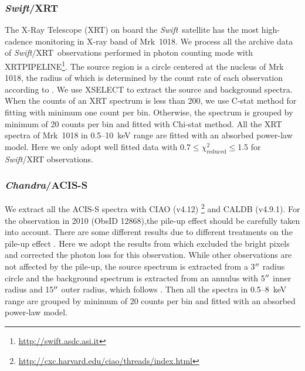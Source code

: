 \documentclass[twocolumn]{aastex63}
\newcommand{\chandra}{{\em Chandra}}
\newcommand{\swift}{{\small \it Swift}}
\newcommand{\xrt}{{\small {\it Swift}/XRT}}
\begin{document}
\subsubsection{\xrt}
\label{data-xrt}
The X-Ray Telescope (XRT) on board the \swift\, satellite has the most high-cadence monitoring in X-ray band of Mrk~1018. We process all the archive data of \xrt\, observations performed in photon counting mode with {\scriptsize XRTPIPELINE}\footnote{\url{http://swift.asdc.asi.it}}. The source region is a circle centered at the nucleus of Mrk 1018, the radius of which is determined by the count rate of each observation according to \citet{2009MNRAS.397.1177E}. We use {\scriptsize XSELECT} to extract the source and background spectra. When the counts of an XRT spectrum is less than 200, we use C-stat method for fitting with minimum one count per bin. Otherwise, the spectrum is grouped by minimum of 20 counts per bin and fitted with Chi-stat method. All the XRT spectra of Mrk~1018 in 0.5--10~keV range are fitted with an absorbed power-law model. Here we only adopt well fitted data with 0.7$\le \chi^2_\mathrm{reduced} \le$1.5 for \swift/XRT observations. 







\subsubsection{\chandra/ACIS-S}
We extract all the ACIS-S spectra with CIAO (v4.12) \footnote{\url{http://cxc.harvard.edu/ciao/threads/index.html}} and {\scriptsize CALDB} (v4.9.1).  For the observation in 2010 (ObsID 12868),the pile-up effect should be carefully taken into account. There are some different results due to different treatments on the pile-up effect \citep[see ][]{2016A&A...593L...9H,2017ApJ...840...11L,2017A&A...607L...9K}. Here we adopt the results from \citet{2016A&A...593L...9H} which excluded the bright pixels and  corrected the photon loss for this observation. While other observations are not affected by the pile-up, the source spectrum is extracted from a 3$\mbox{$^{\prime\prime}$}$ radius circle and the background spectrum is extracted from an annulus with 5$\mbox{$^{\prime\prime}$}$ inner radius and 15$\mbox{$^{\prime\prime}$}$ outer radius, which follows \citet{2017ApJ...840...11L}. Then all the spectra in 0.5--8~keV range are grouped by minimum of 20 counts per bin and fitted with an absorbed power-law model. 
\end{document}
